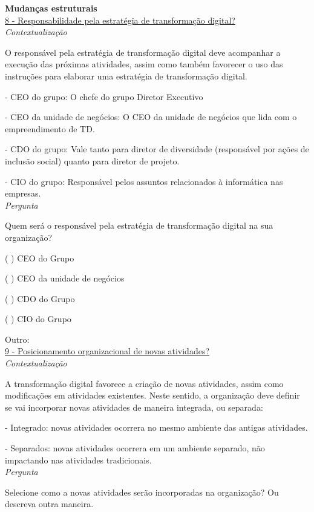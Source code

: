 \textbf{Mudanças estruturais}\\

\underline{8 - Responsabilidade pela estratégia de transformação digital?}\\

\textit{Contextualização}

O responsável pela estratégia de transformação digital deve acompanhar a execução das próximas atividades, assim como também favorecer o uso das instruções para elaborar uma estratégia de transformação digital.

- CEO do grupo: O chefe do grupo Diretor Executivo

- CEO da unidade de negócios: O CEO da unidade de negócios que lida com o empreendimento de TD.

- CDO do grupo: Vale tanto para diretor de diversidade (responsável por ações de inclusão social) quanto para diretor de projeto.

- CIO do grupo: Responsável pelos assuntos relacionados à informática nas empresas.\\


\textit{Pergunta}

Quem será o responsável pela estratégia de transformação digital na sua organização?

( ) CEO do Grupo

( ) CEO da unidade de negócios

( ) CDO do Grupo

( ) CIO do Grupo

Outro:\\

\underline{9 - Posicionamento organizacional de novas atividades?}\\

\textit{Contextualização}

A transformação digital favorece a criação de novas atividades, assim como modificações em atividades existentes. Neste sentido, a organização deve definir se vai incorporar novas atividades de maneira integrada, ou separada:

- Integrado: novas atividades ocorrera no mesmo ambiente das antigas atividades.

- Separados: novas atividades ocorrera em um ambiente separado, não impactando nas atividades tradicionais.\\


\textit{Pergunta}

Selecione como a novas atividades serão incorporadas na organização? Ou descreva outra maneira.

